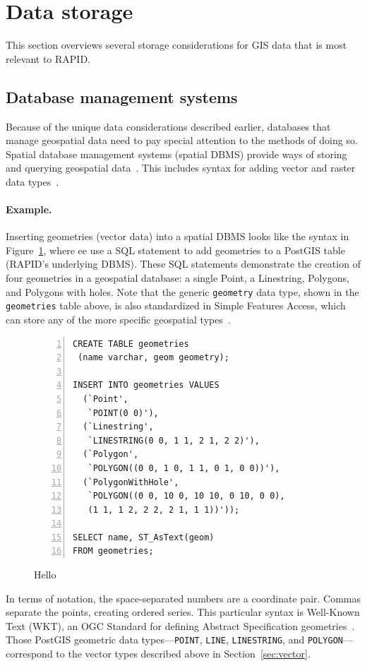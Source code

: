 \section{Data storage}
\label{storage}
This section overviews several storage considerations for GIS data that is most relevant to RAPID.

\subsection{Database management systems}
Because of the unique data considerations described earlier, databases that manage geospatial data need to pay special attention to the methods of doing so. Spatial database management systems (spatial DBMS) provide ways of storing and querying geospatial data~\cite{Boundless}. This includes syntax for adding vector and raster data types~\cite{Boundless}.

\paragraph{Example.}
\label{background_wkt}
Inserting geometries (vector data) into a spatial DBMS looks like the syntax in Figure~\ref{fig:spatialsql}, where ee use a SQL statement to add geometries to a PostGIS table (RAPID's underlying DBMS). These SQL statements demonstrate the creation of four geometries in a geospatial database: a single Point, a Linestring, Polygons, and Polygons with holes. Note that the generic \texttt{geometry} data type, shown in the \texttt{geometries} table above, is also standardized in Simple Features Access, which can store any of the more specific geospatial types~\cite{Boundless,SFA}.

\begin{figure}
\begin{Verbatim}[samepage=true,baselinestretch=1,numbers=left,xleftmargin=12mm]
CREATE TABLE geometries
 (name varchar, geom geometry);

INSERT INTO geometries VALUES
  (`Point',
   `POINT(0 0)'),
  (`Linestring',
   `LINESTRING(0 0, 1 1, 2 1, 2 2)'),
  (`Polygon',
   `POLYGON((0 0, 1 0, 1 1, 0 1, 0 0))'),
  (`PolygonWithHole',
   `POLYGON((0 0, 10 0, 10 10, 0 10, 0 0),
   (1 1, 1 2, 2 2, 2 1, 1 1))'));

SELECT name, ST_AsText(geom)
FROM geometries;
\end{Verbatim}
\caption{Hello}
\label{fig:spatialsql}
\end{figure}

In terms of notation, the space-separated numbers are a coordinate pair. Commas separate the points, creating ordered series. This particular syntax is Well-Known Text (WKT), an OGC Standard for defining Abstract Specification geometries~\cite{ogc}. Those PostGIS geometric data types---\texttt{POINT}, \texttt{LINE}, \texttt{LINESTRING}, and \texttt{POLYGON}---correspond to the vector types described above in Section~\ref{sec:vector}.

